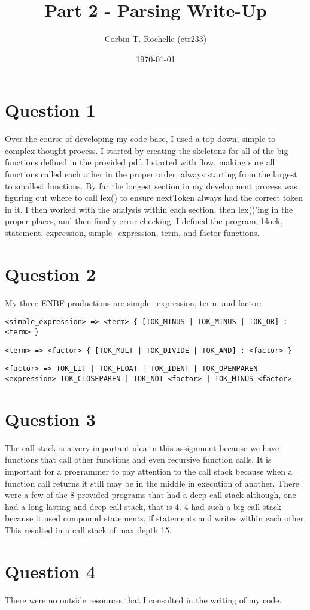 \documentclass{article}
\title{Part 2 - Parsing Write-Up}
\author{Corbin T. Rochelle (ctr233)}
\date{\today}
\begin{document}
\maketitle

\section{Question 1}
Over the course of developing my code base, I used a top-down, simple-to-complex thought process.
I started by creating the skeletons for all of the big functions defined in the provided pdf.
I started with flow, making sure all functions called each other in the proper order, always starting from the largest to smallest functions. 
By far the longest section in my development process was figuring out where to call lex() to ensure nextToken always had the correct token in it.
I then worked with the analysis within each section, then lex()'ing in the proper places, and then finally error checking. 
I defined the program, block, statement, expression, simple_expression, term, and factor functions.

\section{Question 2}
My three ENBF productions are simple_expression, term, and factor:

\begin{verbatim}
<simple_expression> => <term> { [TOK_MINUS | TOK_MINUS | TOK_OR] : <term> } 
\end{verbatim}
\begin{verbatim}
<term> => <factor> { [TOK_MULT | TOK_DIVIDE | TOK_AND] : <factor> }
\end{verbatim}
\begin{verbatim}
<factor> => TOK_LIT | TOK_FLOAT | TOK_IDENT | TOK_OPENPAREN <expression> TOK_CLOSEPAREN | TOK_NOT <factor> | TOK_MINUS <factor>
\end{verbatim}


\section{Question 3}
The call stack is a very important idea in this assignment because we have functions that call other functions and even recursive function calls. 
It is important for a programmer to pay attention to the call stack because when a function call returns it still may be in the middle in execution of another. 
There were a few of the 8 provided programs that had a deep call stack although, one had a long-lasting and deep call stack, that is 4.
4 had such a big call stack because it used compound statements, if statements and writes within each other.
This resulted in a call stack of max depth 15. 

\section{Question 4}
There were no outside resources that I consulted in the writing of my code.
\end{document}
